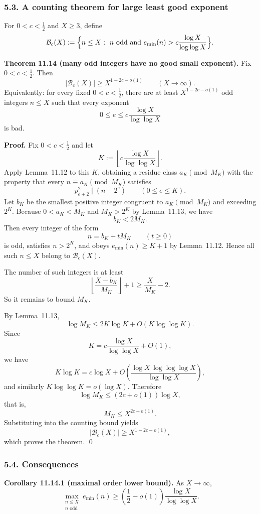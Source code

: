 \subsubsection{5.3. A counting theorem for large least good exponent}
For $0<c<\tfrac12$ and $X\ge 3$, define
\[
 \mathcal B_c(X):=\Bigl\{n\le X:\ n\text{ odd and }e_{\min}(n)>c\frac{\log X}{\log\log X}\Bigr\}.
\]

\textbf{Theorem 11.14 (many odd integers have no good small exponent).}
Fix $0<c<\tfrac12$. Then
\[
 |\mathcal B_c(X)|\ge X^{1-2c-o(1)}
 \qquad (X\to\infty).
\]
Equivalently: for every fixed $0<c<\tfrac12$, there are at least $X^{1-2c-o(1)}$ odd integers $n\le X$ such that every exponent
\[
 0\le e\le c\frac{\log X}{\log\log X}
\]
is bad.

\textbf{Proof.}
Fix $0<c<\tfrac12$ and let
\[
 K:=\left\lfloor c\frac{\log X}{\log\log X}\right\rfloor.
\]
Apply Lemma~11.12 to this $K$, obtaining a residue class $a_K\pmod{M_K}$ with the property that every $n\equiv a_K\pmod{M_K}$ satisfies
\[
 p_{e+2}^2\mid (n-2^e)
 \qquad (0\le e\le K).
\]
Let $b_K$ be the smallest positive integer congruent to $a_K\pmod{M_K}$ and exceeding $2^K$.
Because $0<a_K<M_K$ and $M_K>2^K$ by Lemma~11.13, we have
\[
 b_K<2M_K.
\]
Then every integer of the form
\[
 n=b_K+tM_K\qquad (t\ge 0)
\]
is odd, satisfies $n>2^K$, and obeys $e_{\min}(n)\ge K+1$ by Lemma~11.12. Hence all such $n\le X$ belong to $\mathcal B_c(X)$.

The number of such integers is at least
\[
 \left\lfloor\frac{X-b_K}{M_K}\right\rfloor+1\ge \frac{X}{M_K}-2.
\]
So it remains to bound $M_K$.

By Lemma~11.13,
\[
 \log M_K\le 2K\log K+O(K\log\log K).
\]
Since
\[
 K=c\frac{\log X}{\log\log X}+O(1),
\]
we have
\[
 K\log K=c\log X+O\!\left(\frac{\log X\,\log\log\log X}{\log\log X}\right),
\]
and similarly $K\log\log K=o(\log X)$. Therefore
\[
 \log M_K\le (2c+o(1))\log X,
\]
that is,
\[
 M_K\le X^{2c+o(1)}.
\]
Substituting into the counting bound yields
\[
 |\mathcal B_c(X)|\ge X^{1-2c-o(1)},
\]
which proves the theorem. \qed

\subsubsection{5.4. Consequences}

\textbf{Corollary 11.14.1 (maximal order lower bound).}
As $X\to\infty$,
\[
 \max_{\substack{n\le X\\ n\text{ odd}}} e_{\min}(n)
 \ge \left(\frac12-o(1)\right)\frac{\log X}{\log\log X}.
\]


